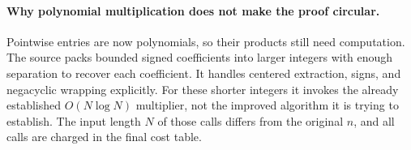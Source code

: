 \paragraph{Why polynomial multiplication does not make the proof circular.}
Pointwise entries are now polynomials, so their products still need computation.
The source packs bounded signed coefficients into larger integers with enough
separation to recover each coefficient. It handles centered extraction, signs,
and negacyclic wrapping explicitly. For these shorter integers it invokes the
already established $O(N\log N)$ multiplier, not the improved algorithm it is
trying to establish. The input length $N$ of those calls differs from the
original $n$, and all calls are charged in the final cost table.

